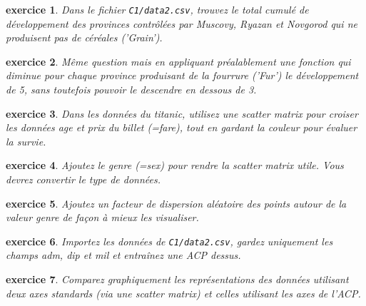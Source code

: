 \documentclass[a4paper]{article}
\newtheorem{exercice}{exercice}
\begin{document}
\begin{exercice}
Dans le fichier \texttt{C1/data2.csv}, trouvez le total cumulé de développement des provinces contrôlées par Muscovy, Ryazan et Novgorod qui ne produisent pas de céréales ('Grain').
\end{exercice}
\begin{exercice}
Même question mais en appliquant préalablement une fonction qui diminue pour chaque province produisant de la fourrure ('Fur') le développement de 5, sans toutefois pouvoir le descendre en dessous de 3.
\end{exercice}

\begin{exercice}
Dans les données du titanic, utilisez une scatter matrix pour croiser les données age et prix du billet (=fare), tout en gardant la couleur pour évaluer la survie.
\end{exercice}
\begin{exercice}
Ajoutez le genre (=sex) pour rendre la scatter matrix utile. Vous devrez convertir le type de données.
\end{exercice}
\begin{exercice}
Ajoutez un facteur de dispersion aléatoire des points autour de la valeur genre de façon à mieux les visualiser.
\end{exercice}

\begin{exercice}
Importez les données de \texttt{C1/data2.csv}, gardez uniquement les champs adm, dip et mil et entraînez une ACP dessus.
\end{exercice}
\begin{exercice}
Comparez graphiquement les représentations des données utilisant deux axes standards (via une scatter matrix) et celles utilisant les axes de l'ACP.
\end{exercice}
\end{document}
